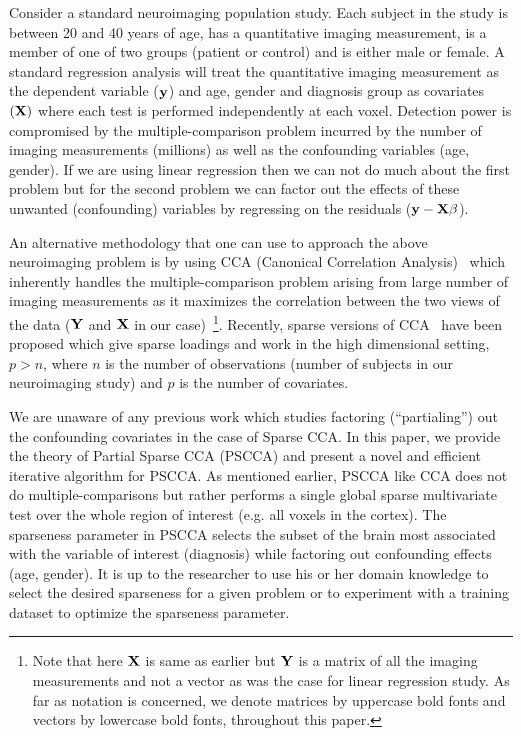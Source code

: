 \documentclass{llncs}
\newcommand{\X}{{\bf X}}
\newcommand{\Y}{{\bf Y}}
\newcommand{\y}{{\bf y}}
\begin{document}

Consider a standard neuroimaging population study.  Each subject in
the study is between 20 and 40 years of age, has a quantitative
imaging measurement, is a member of one of two groups (patient or
control) and is either male or female.  A standard regression analysis
will treat the quantitative imaging measurement as the dependent
variable ($\y$) and age, gender and diagnosis group as covariates $({\X})$ where
each test is performed independently at each voxel.  Detection power
is compromised by the multiple-comparison problem incurred by the
number of imaging measurements (millions) as well as the confounding
variables (age, gender).  If we are using linear regression then we can not do much about the first problem but for the second problem we can factor out the effects of these unwanted (confounding) variables by regressing on the residuals ($\y -\X\beta$). 


An alternative methodology that one can use to approach the above neuroimaging  problem is by using CCA (Canonical Correlation Analysis)~\cite{hotellingcca} which inherently handles the multiple-comparison problem arising from large number of imaging measurements as it maximizes the correlation between the two views of the data ($\Y$ and $\X$ in our case)~\footnote{Note that here {$\X$} is same as earlier but $\Y$ is a matrix of all the imaging measurements and not a vector as was the case for linear regression study. As far as notation is concerned, we denote matrices by uppercase bold fonts and vectors by lowercase bold fonts, throughout this paper. }. Recently, sparse versions of CCA~\cite{parkhomenko,witten,lykou} have been proposed which give sparse loadings and work in the high dimensional setting, $p >n$, where $n$ is the number of observations (number of subjects in our neuroimaging study) and $p$ is the number of covariates. 

We are unaware of any previous work which studies factoring (``partialing'') out the confounding covariates in the case of Sparse CCA. In this paper, we provide the theory of Partial Sparse CCA (PSCCA) and present a novel and efficient iterative algorithm for PSCCA. As mentioned earlier, PSCCA like CCA does not do multiple-comparisons but rather performs a single global sparse multivariate test  over the whole region of interest (e.g. all voxels in the cortex). The sparseness parameter in
PSCCA selects the subset of the brain most associated with the
variable of interest (diagnosis) while factoring out confounding
effects (age, gender).  It is up to the researcher to use his or her
domain knowledge to select the desired sparseness for a given problem
or to experiment with a training dataset to optimize the sparseness
parameter.
\end{document}
